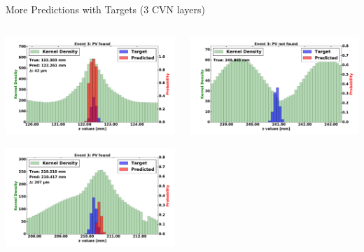 \begin{frame}{More Predictions with Targets (3 CVN layers)}
  \begin{columns}[c]
        \begin{center}
            \includegraphics[width=1\textwidth,height=0.45\textwidth, trim=18 0 18 0]{images/120000_3layer_20.pdf}
    
            \includegraphics[width=1\textwidth, height=0.45\textwidth,trim=18 0 18 0]{images/120000_3layer_21.pdf}

        \end{center}
        \begin{center}
           \includegraphics[width=1\textwidth, height=0.45\textwidth, trim=18 0 18 0]{images/120000_3layer_22.pdf}
    

\end{center}
\end{columns}
\end{frame}
